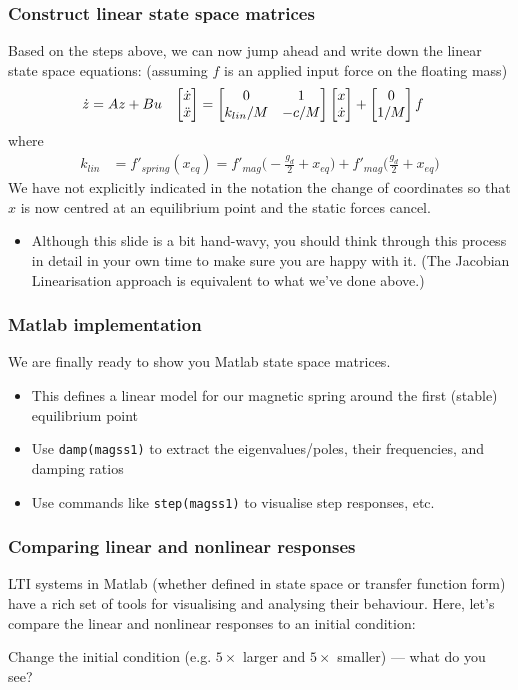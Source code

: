 \documentclass[9pt]{beamer-control}
\begin{document}
\begin{frame}
  \frametitle{Construct linear state space matrices}
  Based on the steps above, we can now jump ahead and write down the linear state space equations: (assuming $f$ is an applied input force on the floating mass)
  \begin{align}
    \dot z &= Az + Bu &
    \begin{bmatrix} \dot x \\ \ddot x \end{bmatrix} &= \begin{bmatrix} 0 & 1 \\ k_{lin}/M & -c/M \end{bmatrix} \begin{bmatrix} x\\ \dot x \end{bmatrix} + \begin{bmatrix}0 \\ 1/M\end{bmatrix}f
  \end{align}
  where
  \begin{align}
    k_{lin} &= f'_{spring}(x_{eq}) = f'_{mag}\bigl(-\tfrac{g_d}{2}+x_{eq}\bigr) + f'_{mag}\bigl(\tfrac{g_d}{2}+x_{eq}\bigr)
  \end{align}
  We have not explicitly indicated in the notation the change of coordinates so that $x$ is now centred at an equilibrium point and the static forces cancel.

  \begin{itemize}
    \item \scriptsize Although this slide is a bit hand-wavy, you should think through this process in detail in your own time to make sure you are happy with it.
      (The Jacobian Linearisation approach is equivalent to what we've done above.)
  \end{itemize}
\end{frame}

\begin{frame}
  \frametitle{Matlab implementation}
  \alert{We are finally ready to show you Matlab state space matrices.}


  \begin{itemize}
    \item This defines a linear model for our magnetic spring around the first (stable) equilibrium point
    \item Use \texttt{damp(magss1)} to extract the eigenvalues/poles, their frequencies, and damping ratios
    \item Use commands like \texttt{step(magss1)} to visualise step responses, etc.
  \end{itemize}

\end{frame}

\begin{frame}
  \frametitle{Comparing linear and nonlinear responses}
  LTI systems in Matlab (whether defined in state space or transfer function form) have a rich set of tools for visualising and analysing their behaviour. Here, let's compare the linear and nonlinear responses to an initial condition:


  Change the initial condition (e.g. $5\times$ larger and $5\times$ smaller) --- what do you see?

\end{frame}
\end{document}
